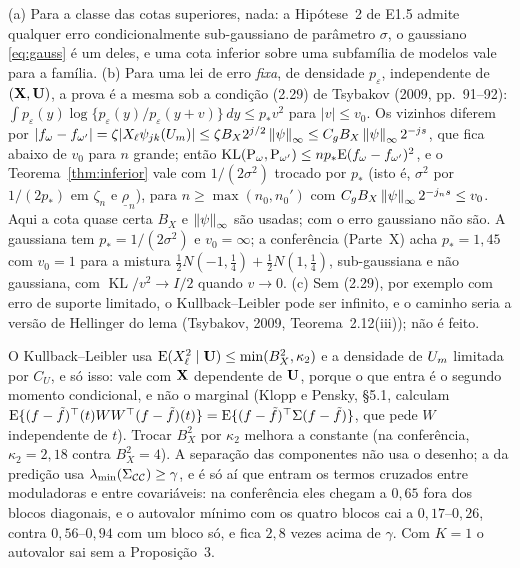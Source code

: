\documentclass[11pt,a4paper]{article}
\newcommand{\lmin}{\lambda_{\min}}
\newcommand{\Ccal}{\mathcal{C}}
\newcommand{\rlow}{\underline{\rho}_{n}}
\newcommand{\KL}{\operatorname{KL}}
\begin{document}
\begin{remark}\label{rem:ruido}
(a) Para a classe das cotas superiores, nada: a Hipótese~2 de E1.5 admite
qualquer erro condicionalmente sub-gaussiano de parâmetro $\sigma$, o
gaussiano \eqref{eq:gauss} é um deles, e uma cota inferior sobre uma
subfamília de modelos vale para a família. (b) Para uma lei de erro
\emph{fixa}, de densidade $p_{\varepsilon}$, independente de $(\mathbf{X},\mathbf{U})$, a
prova é a mesma sob a condição (2.29) de Tsybakov (2009, pp.~91--92):
$\int p_{\varepsilon}(y)\log\{p_{\varepsilon}(y)/p_{\varepsilon}(y+v)\}\,dy
\le p_{*}v^{2}$ para $|v| \le v_{0}$. Os vizinhos diferem por
$|f_{\omega} - f_{\omega'}| = \zeta|X_{\ell}\psi_{jk}(U_{m})| \le
\zeta B_{X}2^{j/2}\left\lVert \psi \right\rVert_{\infty} \le C_{g}B_{X}\left\lVert \psi \right\rVert_{\infty}
2^{-j s}$, que fica abaixo de $v_{0}$ para $n$ grande; então
$\KL(\Prob_{\omega},\Prob_{\omega'}) \le np_{*}\E(f_{\omega} -
f_{\omega'})^{2}$, e o Teorema~\ref{thm:inferior} vale com $1/(2\sigma^{2})$
trocado por $p_{*}$ (isto é, $\sigma^{2}$ por $1/(2p_{*})$ em $\zeta_{n}$ e
$\rlow$), para $n \ge \max(n_{0},n_{0}')$ com $C_{g}B_{X}\left\lVert \psi \right\rVert_{\infty}
2^{-j_{n}s} \le v_{0}$. Aqui a cota quase certa $B_{X}$ e
$\left\lVert \psi \right\rVert_{\infty}$ são usadas; com o erro gaussiano não são. A gaussiana
tem $p_{*} = 1/(2\sigma^{2})$ e $v_{0} = \infty$; a conferência (Parte~X)
acha $p_{*} = 1{,}45$ com $v_{0} = 1$ para a mistura $\frac12N(-1,\frac14) +
\frac12N(1,\frac14)$, sub-gaussiana e não gaussiana, com $\KL/v^{2} \to I/2$
quando $v \to 0$. (c) Sem (2.29), por exemplo com erro de suporte limitado,
o Kullback--Leibler pode ser infinito, e o caminho seria a versão de
Hellinger do lema (Tsybakov, 2009, Teorema~2.12(iii)); não é feito.
\end{remark}

\begin{remark}\label{rem:desenho}
O Kullback--Leibler usa $\mathrm{E}(X_{\ell}^{2}\mid\mathbf{U}) \le \min(B_{X}^{2},\kappa_{2})$
e a densidade de $U_{m}$ limitada por $C_{U}$, e só isso: vale com $\mathbf{X}$
dependente de $\mathbf{U}$, porque o que entra é o segundo momento condicional, e
não o marginal (Klopp e Pensky, \S5.1, calculam $\mathrm{E}\{(f-\tilde
f)^{\top}(t)W W^{\top}(f-\tilde f)(t)\} = \mathrm{E}\{(f-\tilde f)^{\top}\Sigma(f-\tilde f)\}$, que
pede $W$ independente de $t$). Trocar $B_{X}^{2}$ por $\kappa_{2}$ melhora a
constante (na conferência, $\kappa_{2} = 2{,}18$ contra $B_{X}^{2} = 4$). A
separação das componentes não usa o desenho; a da predição usa
$\lmin(\Gram_{\Ccal\Ccal}) \ge \gamma$, e é só aí que entram os termos
cruzados entre moduladoras e entre covariáveis: na conferência eles chegam a
$0{,}65$ fora dos blocos diagonais, e o autovalor mínimo com os quatro blocos
cai a $0{,}17$--$0{,}26$, contra $0{,}56$--$0{,}94$ com um bloco só, e fica
$2{,}8$ vezes acima de $\gamma$. Com $K = 1$ o autovalor sai sem a Proposição~3.
\end{remark}
\end{document}
